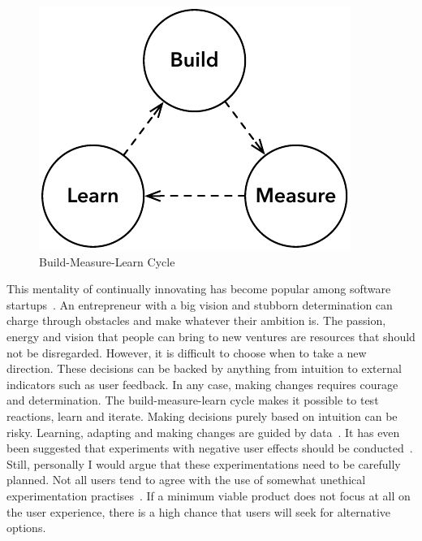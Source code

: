 \documentclass[english]{tktltiki2}
\begin{document}
\begin{figure}[h!]

    \centering

    \includegraphics[scale = 0.6]{figures/build-measure-learn}

    \caption{Build-Measure-Learn Cycle}
    \label{figure:build-measure-learn}

    \vspace{1cm}

\end{figure}

This mentality of continually innovating has become popular among software startups~\cite{Rie11}. An entrepreneur with a big vision and stubborn determination can charge through obstacles and make whatever their ambition is. The passion, energy and vision that people can bring to new ventures are resources that should not be disregarded. However, it is difficult to choose when to take a new direction. These decisions can be backed by anything from intuition to external indicators such as user feedback. In any case, making changes requires courage and determination. The build-measure-learn cycle makes it possible to test reactions, learn and iterate. Making decisions purely based on intuition can be risky. Learning, adapting and making changes are guided by data~\cite{Rie11}. It has even been suggested that experiments with negative user effects should be conducted~\cite{KLS09, KDF12, Bos12}. Still, personally I would argue that these experimentations need to be carefully planned. Not all users tend to agree with the use of somewhat unethical experimentation practises~\cite{RM13}. If a minimum viable product does not focus at all on the user experience, there is a high chance that users will seek for alternative options.
\end{document}
